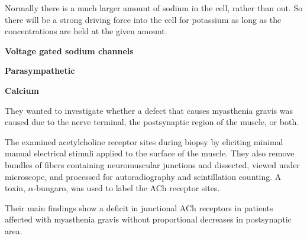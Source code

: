 \documentclass[basic]{inVerba-notes}
\begin{document}
\begin{enumerate}
\begin{center}
  \end{center}

  Normally there is a much larger amount of sodium in the cell, rather than out. So there will be a strong driving force into the cell for potassium as long as the concentrations are held at the given amount.


  \textbf{Voltage gated sodium channels}
  

  \textbf{Parasympathetic}
  
  
  \textbf{Calcium}

  

  They wanted to investigate whether a defect that causes myasthenia gravis was caused due to the nerve terminal, the postsynaptic region of the muscle, or both. 
  

  The examined acetylcholine receptor sites during biopsy by eliciting minimal manual electrical stimuli applied to the surface of the muscle. They also remove bundles of fibers containing neuromuscular junctions and dissected, viewed under microscope, and processed for autoradiography and scintillation counting. A toxin, \(\alpha \)-bungaro, was used to label the ACh receptor sites.


  Their main findings show a deficit in junctional ACh receptors in patients affected with myasthenia gravis without proportional decreases in postsynaptic area.


\end{enumerate}
\end{document}
